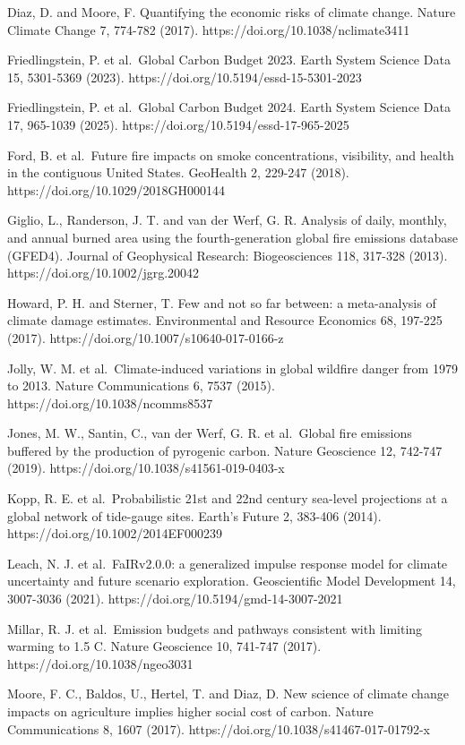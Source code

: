 \documentclass[12pt]{article}
\begin{document}
Diaz, D. and Moore, F. Quantifying the economic risks of climate change.
Nature Climate Change 7, 774-782 (2017).
https://doi.org/10.1038/nclimate3411

Friedlingstein, P. et al.~Global Carbon Budget 2023. Earth System
Science Data 15, 5301-5369 (2023).
https://doi.org/10.5194/essd-15-5301-2023

Friedlingstein, P. et al.~Global Carbon Budget 2024. Earth System
Science Data 17, 965-1039 (2025).
https://doi.org/10.5194/essd-17-965-2025

Ford, B. et al.~Future fire impacts on smoke concentrations, visibility,
and health in the contiguous United States. GeoHealth 2, 229-247 (2018).
https://doi.org/10.1029/2018GH000144

Giglio, L., Randerson, J. T. and van der Werf, G. R. Analysis of daily,
monthly, and annual burned area using the fourth-generation global fire
emissions database (GFED4). Journal of Geophysical Research:
Biogeosciences 118, 317-328 (2013). https://doi.org/10.1002/jgrg.20042

Howard, P. H. and Sterner, T. Few and not so far between: a
meta-analysis of climate damage estimates. Environmental and Resource
Economics 68, 197-225 (2017). https://doi.org/10.1007/s10640-017-0166-z

Jolly, W. M. et al.~Climate-induced variations in global wildfire danger
from 1979 to 2013. Nature Communications 6, 7537 (2015).
https://doi.org/10.1038/ncomms8537

Jones, M. W., Santin, C., van der Werf, G. R. et al.~Global fire
emissions buffered by the production of pyrogenic carbon. Nature
Geoscience 12, 742-747 (2019). https://doi.org/10.1038/s41561-019-0403-x

Kopp, R. E. et al.~Probabilistic 21st and 22nd century sea-level
projections at a global network of tide-gauge sites. Earth's Future 2,
383-406 (2014). https://doi.org/10.1002/2014EF000239

Leach, N. J. et al.~FaIRv2.0.0: a generalized impulse response model for
climate uncertainty and future scenario exploration. Geoscientific Model
Development 14, 3007-3036 (2021).
https://doi.org/10.5194/gmd-14-3007-2021

Millar, R. J. et al.~Emission budgets and pathways consistent with
limiting warming to 1.5 C. Nature Geoscience 10, 741-747 (2017).
https://doi.org/10.1038/ngeo3031

Moore, F. C., Baldos, U., Hertel, T. and Diaz, D. New science of climate
change impacts on agriculture implies higher social cost of carbon.
Nature Communications 8, 1607 (2017).
https://doi.org/10.1038/s41467-017-01792-x
\end{document}
